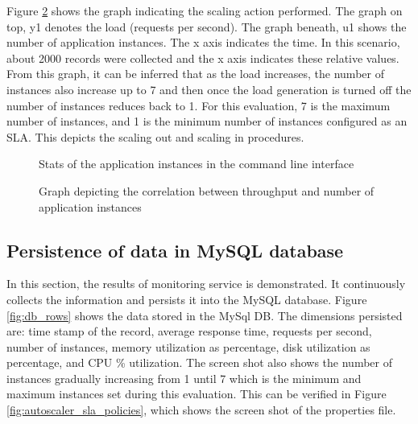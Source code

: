\documentclass[article,type=msc,colorback,12pt,accentcolor=tud8b,table]{tudthesis}
\begin{document}
	Figure \ref{fig:responsetTime_Instances} shows the graph indicating the scaling action performed. The graph on top, y1 denotes the load (requests per second). The graph beneath, u1 shows the number of application instances. The x axis indicates the time. In this scenario, about 2000 records were collected and the x axis indicates these relative values. From this graph, it can be inferred that as the load increases, the number of instances also increase up to 7 and then once the load generation is turned off the number of instances reduces back to 1. For this evaluation, 7 is the maximum number of instances, and 1 is the minimum number of instances configured as an SLA. This depicts the scaling out and scaling in procedures. 
	
	  \begin{figure}[h]
	  	\begin{center}
	  		\makebox[\textwidth]{\texttt{[image: E4]}}
	  	\end{center}
	  	\caption{Stats of the application instances in the command line interface}
	  	\label{fig:cf_cli}
	  \end{figure}
	  
	  	  \begin{figure}[h]
	  	  	\begin{center}
	  	  		\makebox[\textwidth]{\texttt{[image: E5]}}
	  	  	\end{center}
	  	  	\caption{Graph depicting the correlation between throughput and number of application instances}
	  	  	\label{fig:responsetTime_Instances}
	  	  \end{figure}
	
	\subsection{Persistence of data in MySQL database}
		In this section, the results of monitoring service is demonstrated. It continuously collects the information and persists it into the MySQL database.  Figure \ref{fig:db_rows} shows the data stored in the MySql DB. The dimensions persisted are: time stamp of the record, average response time, requests per second, number of instances, memory utilization as percentage, disk utilization as percentage, and CPU \% utilization. The screen shot also shows the number of instances gradually increasing from 1 until 7 which is the minimum and maximum instances set during this evaluation. This can be verified in Figure \ref{fig:autoscaler_sla_policies}, which shows the screen shot of the properties file. 
	
\end{document}
